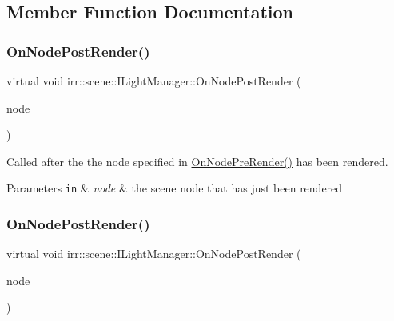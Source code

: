 \subsection{Member Function Documentation}
\mbox{\label{classirr_1_1scene_1_1ILightManager_aa9e6195a3a783a97f440a4b947090ab0}} 
\subsubsection{\texorpdfstring{On\+Node\+Post\+Render()}{OnNodePostRender()}\hspace{0.1cm}{\footnotesize\ttfamily [1/2]}}
{\footnotesize\ttfamily virtual void irr\+::scene\+::\+I\+Light\+Manager\+::\+On\+Node\+Post\+Render (\begin{DoxyParamCaption}\item[{\hyperlink{classirr_1_1scene_1_1ISceneNode}{I\+Scene\+Node} $\ast$}]{node }\end{DoxyParamCaption})\hspace{0.3cm}{\ttfamily [pure virtual]}}



Called after the the node specified in \hyperlink{classirr_1_1scene_1_1ILightManager_a23ae7bdf54613e6dd41d4138cb6f5edc}{On\+Node\+Pre\+Render()} has been rendered. 


\begin{DoxyParams}[1]{Parameters}
\mbox{\tt in}  & {\em node} & the scene node that has just been rendered \\
\hline
\end{DoxyParams}
\mbox{\label{classirr_1_1scene_1_1ILightManager_aa9e6195a3a783a97f440a4b947090ab0}} 
\subsubsection{\texorpdfstring{On\+Node\+Post\+Render()}{OnNodePostRender()}\hspace{0.1cm}{\footnotesize\ttfamily [2/2]}}
{\footnotesize\ttfamily virtual void irr\+::scene\+::\+I\+Light\+Manager\+::\+On\+Node\+Post\+Render (\begin{DoxyParamCaption}\item[{\hyperlink{classirr_1_1scene_1_1ISceneNode}{I\+Scene\+Node} $\ast$}]{node }\end{DoxyParamCaption})\hspace{0.3cm}{\ttfamily [pure virtual]}}



